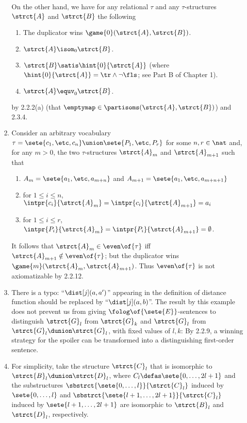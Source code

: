 \begin{enumerate}[1.]
On the other hand, we have for any relational $\tau$ and any $\tau$-structures $\strct{A}$ and $\strct{B}$ the following
\begin{enumerate}[(1)]
\item The duplicator wins $\game{0}(\strct{A}, \strct{B})$.
\item $\strct{A} \isom_0 \strct{B}$.
\item $\strct{B} \satis \hint{0}{\strct{A}}$ (where $\hint{0}{\strct{A}} = \tr \land \neg\fls$; see Part B of Chapter 1).
\item $\strct{A} \equv_0 \strct{B}$.
\end{enumerate}
by 2.2.2(a) (that $\emptymap \in \partisoms(\strct{A}, \strct{B})$) and 2.3.4.
%
\item {} Consider an arbitrary vocabulary $\tau = \sete{c_1, \etc, c_n} \union \sete{P_1, \etc, P_r}$ for some $n, r \in \nat$ and, for any $m > 0$, the two $\tau$-structures $\strct{A}_m$ and $\strct{A}_{m + 1}$ such that
\begin{enumerate}[(1)]
\item $A_m = \sete{a_1, \etc, a_{m + n}}$ and $A_{m + 1} = \sete{a_1, \etc, a_{m + n + 1}}$
\item for $1 \leq i \leq n$, $\intpr{c_i}{\strct{A}_m} = \intpr{c_i}{\strct{A}_{m + 1}} = a_i$
\item for $1 \leq i \leq r$, $\intpr{P_i}{\strct{A}_m} = \intpr{P_i}{\strct{A}_{m + 1}} = \emptyset$.
\end{enumerate}
It follows that $\strct{A}_m \in \even\of{\tau}$ iff $\strct{A}_{m + 1} \notin \even\of{\tau}$; but the duplicator wins $\game{m}(\strct{A}_m, \strct{A}_{m + 1})$. Thus $\even\of{\tau}$ is not axiomatizable by 2.2.12.
%
\item {} There is a typo: ``$\dist[j](a, a')$'' appearing in the definition of distance function should be replaced by ``$\dist[j](a, b)$''.
\newpar
The result by this example does not prevent us from giving $\folog\of{\sete{E}}$-sentences to distinguish $\strct{G}_l$ from $\strct{G}_k$ and $\strct{G}_l$ from $\strct{G}_l \dunion \strct{G}_l$, with fixed values of $l, k$: By 2.2.9, a winning strategy for the spoiler can be transformed into a distinguishing first-order sentence.
%
\item {} For simplicity, take the structure $\strct{C}_l$ that is isomorphic to $\strct{B}_l \dunion \strct{D}_l$, where $C_l \defas \sete{0, \ldots, 2l + 1}$ and the substructures $\sbstrct{\sete{0, \ldots, l}}{\strct{C}_l}$ induced by $\sete{0, \ldots, l}$ and $\sbstrct{\sete{l + 1, \ldots, 2l + 1}}{\strct{C}_l}$ induced by $\sete{l + 1, \ldots, 2l + 1}$ are isomorphic to $\strct{B}_l$ and $\strct{D}_l$, respectively.

\end{enumerate}
